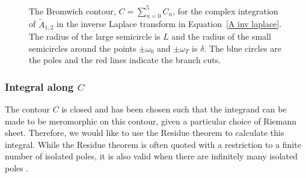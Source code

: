 \documentclass[12pt]{../style-files/ociamthesis}
\begin{document}
\begin{figure}
{ 
	}
	\caption{The Bromwich contour, $C = \sum_{n = 0}^{5}C_n$, for the complex integration of $\tilde{A}_{1,2}$ in the inverse Laplace transform in Equation~\eqref{A inv laplace}. The radius of the large semicircle is $L$ and the radius of the small semicircles around the points $\pm \omega_0$ and $\pm \omega_T$ is $\delta$. The blue circles are the poles and the red lines indicate the branch cuts.}
	\label{fig: brom contour}
\end{figure}

\subsubsection{Integral along $C$}
The contour $C$ is closed and has been chosen such that the integrand can be made to be meromorphic on this contour, given a particular choice of Riemann sheet. Therefore, we would like to use the Residue theorem to calculate this integral. While the Residue theorem is often quoted with a restriction to a finite number of isolated poles, it is also valid when there are infinitely many isolated poles \citep{ahl79}.
\end{document}
